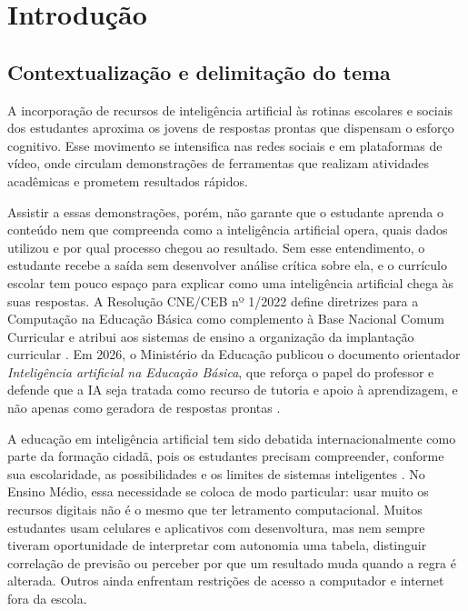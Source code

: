 \chapter{Introdução}

\section{Contextualização e delimitação do tema}

A incorporação de recursos de inteligência artificial às rotinas escolares e sociais dos estudantes aproxima os jovens de respostas prontas que dispensam o esforço cognitivo. Esse movimento se intensifica nas redes sociais e em plataformas de vídeo, onde circulam demonstrações de ferramentas que realizam atividades acadêmicas e prometem resultados rápidos.

Assistir a essas demonstrações, porém, não garante que o estudante aprenda o conteúdo nem que compreenda como a inteligência artificial opera, quais dados utilizou e por qual processo chegou ao resultado. Sem esse entendimento, o estudante recebe a saída sem desenvolver análise crítica sobre ela, e o currículo escolar tem pouco espaço para explicar como uma inteligência artificial chega às suas respostas. A Resolução CNE/CEB nº 1/2022 define diretrizes para a Computação na Educação Básica como complemento à Base Nacional Comum Curricular e atribui aos sistemas de ensino a organização da implantação curricular \cite{brasil2022computacao}. Em 2026, o Ministério da Educação publicou o documento orientador \textit{Inteligência artificial na Educação Básica}, que reforça o papel do professor e defende que a IA seja tratada como recurso de tutoria e apoio à aprendizagem, e não apenas como geradora de respostas prontas \cite{brasil2026iaeducacaobasica}.

A educação em inteligência artificial tem sido debatida internacionalmente como parte da formação cidadã, pois os estudantes precisam compreender, conforme sua escolaridade, as possibilidades e os limites de sistemas inteligentes \cite{touretzky2019envisioning}. No Ensino Médio, essa necessidade se coloca de modo particular: usar muito os recursos digitais não é o mesmo que ter letramento computacional. Muitos estudantes usam celulares e aplicativos com desenvoltura, mas nem sempre tiveram oportunidade de interpretar com autonomia uma tabela, distinguir correlação de previsão ou perceber por que um resultado muda quando a regra é alterada. Outros ainda enfrentam restrições de acesso a computador e internet fora da escola.

